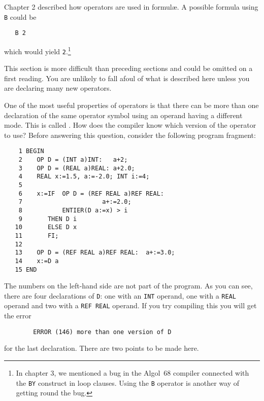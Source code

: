 Chapter 2 described how operators are used in formul\ae{}. A possible
formula using \verb|B| could be
\begin{verbatim}
   B 2
\end{verbatim}
\noindent
which would yield \verb|2|.\footnote{In chapter 3, we mentioned a bug
in the \protect{} Algol~68 compiler
connected with the \texttt{BY} construct in loop clauses. Using the
\texttt{B} operator is another way of getting round the bug.}

This section is more difficult than preceding sections and could be
omitted on a first reading. You are unlikely to fall afoul of what is
described here unless you are declaring many new operators.

One of the most useful properties of operators is that there can be
more than one declaration of the same operator symbol using an
operand having a different mode. This is called
.
How does the compiler know which version of the operator to use?
Before answering this question, consider the following program
fragment:
\begin{verbatim}
    1 BEGIN
    2    OP D = (INT a)INT:   a+2;
    3    OP D = (REAL a)REAL: a+2.0;
    4    REAL x:=1.5, a:=-2.0; INT i:=4;
    5
    6    x:=IF  OP D = (REF REAL a)REF REAL:
    7                      a+:=2.0;
    8           ENTIER(D a:=x) > i
    9       THEN D i
   10       ELSE D x
   11       FI;
   12
   13    OP D = (REF REAL a)REF REAL:  a+:=3.0;
   14    x:=D a
   15 END
\end{verbatim}
\noindent
The numbers on the left-hand side are not part of the program. As you
can see, there are four declarations of \verb|D|: one with an
\verb|INT| operand, one with a \verb|REAL| operand and two with a
\verb|REF REAL| operand. If you try compiling this you will get the
error
\begin{verbatim}
        ERROR (146) more than one version of D
\end{verbatim}
\noindent
for the last declaration. There are two points to be made here.
